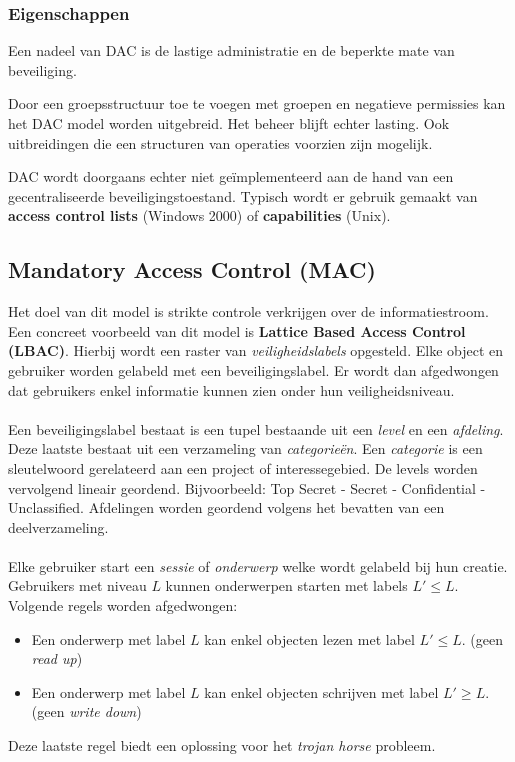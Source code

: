 \documentclass[../main.tex]{subfiles}
\begin{document}
\subsubsection{Eigenschappen}
Een nadeel van DAC is de lastige administratie en de beperkte mate van beveiliging.

Door een groepsstructuur toe te voegen met groepen en negatieve permissies kan het DAC model worden uitgebreid. Het beheer blijft echter lasting. Ook uitbreidingen die een structuren van operaties voorzien zijn mogelijk.

DAC wordt doorgaans echter niet ge\"implementeerd aan de hand van een gecentraliseerde beveiligingstoestand. Typisch wordt er gebruik gemaakt van \textbf{access control lists} (Windows 2000) of \textbf{capabilities} (Unix).

\subsection{Mandatory Access Control (MAC)}
Het doel van dit model is strikte controle verkrijgen over de informatiestroom. Een concreet voorbeeld van dit model is \textbf{Lattice Based Access Control (LBAC)}. Hierbij wordt een raster van \textit{veiligheidslabels} opgesteld. Elke object en gebruiker worden gelabeld met een beveiligingslabel. Er wordt dan afgedwongen dat gebruikers enkel informatie kunnen zien onder hun veiligheidsniveau. 
\\\\
Een beveiligingslabel bestaat is een tupel bestaande uit een \textit{level} en een \textit{afdeling}. Deze laatste bestaat uit een verzameling van \textit{categorie\"en}. Een \textit{categorie} is een sleutelwoord gerelateerd aan een project of interessegebied. De levels worden vervolgend lineair geordend. Bijvoorbeeld: Top Secret - Secret - Confidential - Unclassified. Afdelingen worden geordend volgens het bevatten van een deelverzameling.
\\\\
Elke gebruiker start een \textit{sessie} of \textit{onderwerp} welke wordt gelabeld bij hun creatie. Gebruikers met niveau $L$ kunnen onderwerpen starten met labels $L' \leq L$.  Volgende regels worden afgedwongen:
\begin{itemize}
	\item Een onderwerp met label $L$ kan enkel objecten lezen met label $L' \leq L$. (geen \textit{read up})
	\item Een onderwerp met label $L$ kan enkel objecten schrijven met label $L' \geq L$. (geen \textit{write down})
\end{itemize}
Deze laatste regel biedt een oplossing voor het \textit{trojan horse} probleem.
\end{document}
